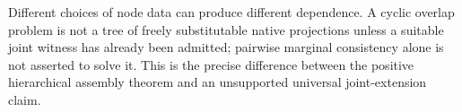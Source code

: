 \documentclass[11pt]{article}
\begin{document}
Different choices of node data can produce different dependence. A cyclic overlap problem is not a tree of freely substitutable native projections unless a suitable joint witness has already been admitted; pairwise marginal consistency alone is not asserted to solve it. This is the precise difference between the positive hierarchical assembly theorem and an unsupported universal joint-extension claim.
\end{document}
